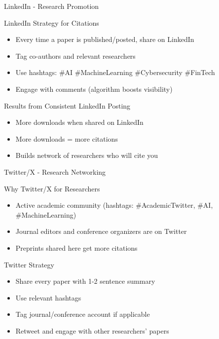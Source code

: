 \documentclass[11pt]{beamer}
\begin{document}
	\begin{frame}{LinkedIn - Research Promotion}
		\scriptsize
		\begin{block}{LinkedIn Strategy for Citations}
			\begin{itemize}
				\item Every time a paper is published/posted, share on LinkedIn
				\item Tag co-authors and relevant researchers
				\item Use hashtags: \#AI \#MachineLearning \#Cybersecurity \#FinTech
				\item Engage with comments (algorithm boosts visibility)
			\end{itemize}
		\end{block}
		\begin{block}{Results from Consistent LinkedIn Posting}
			\begin{itemize}
				\item More downloads when shared on LinkedIn
				\item More downloads = more citations
				\item Builds network of researchers who will cite you
			\end{itemize}
		\end{block}
	\end{frame}
	
	\begin{frame}{Twitter/X - Research Networking}
		\scriptsize
		\begin{block}{Why Twitter/X for Researchers}
			\begin{itemize}
				\item Active academic community (hashtags: \#AcademicTwitter, \#AI, \#MachineLearning)
				\item Journal editors and conference organizers are on Twitter
				\item Preprints shared here get more citations
			\end{itemize}
		\end{block}
		\begin{block}{Twitter Strategy}
			\begin{itemize}
				\item Share every paper with 1-2 sentence summary
				\item Use relevant hashtags
				\item Tag journal/conference account if applicable
				\item Retweet and engage with other researchers' papers
			\end{itemize}
		\end{block}
	\end{frame}
	
\end{document}
